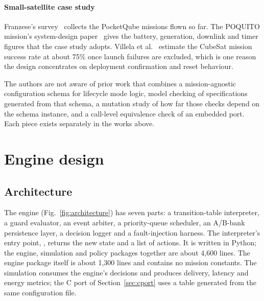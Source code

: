 \documentclass[preprint,12pt]{elsarticle}
\begin{document}
\paragraph{Small-satellite case study} Franzese's survey~\cite{Franzese2025Survey} collects the PocketQube missions flown so far. The POQUITO mission's system-design paper~\cite{Franzese2026POQUITO} gives the battery, generation, downlink and timer figures that the case study adopts. Villela et al.~\cite{Villela2019Thousandth} estimate the CubeSat mission success rate at about 75\% once launch failures are excluded, which is one reason the design concentrates on deployment confirmation and reset behaviour.

The authors are not aware of prior work that combines a mission-agnostic configuration schema for lifecycle mode logic, model checking of specifications generated from that schema, a mutation study of how far those checks depend on the schema instance, and a call-level equivalence check of an embedded port. Each piece exists separately in the works above.

\section{Engine design}\label{sec:design}

\subsection{Architecture}

The engine (Fig.~\ref{fig:architecture}) has seven parts: a transition-table interpreter, a guard evaluator, an event arbiter, a priority-queue scheduler, an A/B-bank persistence layer, a decision logger and a fault-injection harness. The interpreter's entry point, , returns the new state and a list of actions. It is written in Python; the engine, simulation and policy packages together are about 4,600 lines. The engine package itself is about 1,300 lines and contains no mission constants. The simulation consumes the engine's decisions and produces delivery, latency and energy metrics; the C port of Section~\ref{sec:cport} uses a table generated from the same configuration file.
\end{document}
